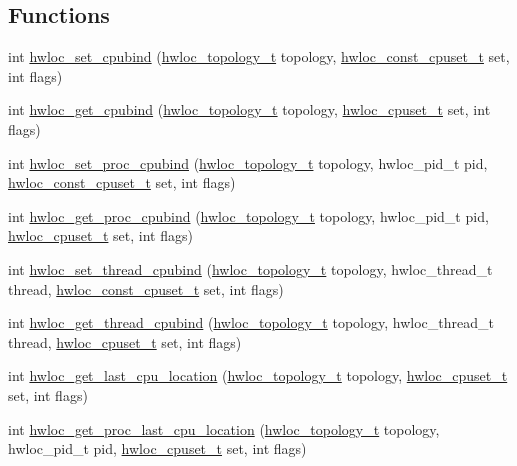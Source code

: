 \subsection*{Functions}
\begin{DoxyCompactItemize}
\item 
int \hyperlink{a00190_ga80bc07473a8edf840cae17bd7ec21d48}{hwloc\+\_\+set\+\_\+cpubind} (\hyperlink{a00186_ga9d1e76ee15a7dee158b786c30b6a6e38}{hwloc\+\_\+topology\+\_\+t} topology, \hyperlink{a00183_ga1f784433e9b606261f62d1134f6a3b25}{hwloc\+\_\+const\+\_\+cpuset\+\_\+t} set, int flags)
\item 
int \hyperlink{a00190_gacba7ecb979baf824d5240fa2cb2a8be6}{hwloc\+\_\+get\+\_\+cpubind} (\hyperlink{a00186_ga9d1e76ee15a7dee158b786c30b6a6e38}{hwloc\+\_\+topology\+\_\+t} topology, \hyperlink{a00183_ga4bbf39b68b6f568fb92739e7c0ea7801}{hwloc\+\_\+cpuset\+\_\+t} set, int flags)
\item 
int \hyperlink{a00190_ga296db8a3c6d49b51fb83d6f3e45c02a6}{hwloc\+\_\+set\+\_\+proc\+\_\+cpubind} (\hyperlink{a00186_ga9d1e76ee15a7dee158b786c30b6a6e38}{hwloc\+\_\+topology\+\_\+t} topology, hwloc\+\_\+pid\+\_\+t pid, \hyperlink{a00183_ga1f784433e9b606261f62d1134f6a3b25}{hwloc\+\_\+const\+\_\+cpuset\+\_\+t} set, int flags)
\item 
int \hyperlink{a00190_gac82de91f788fa82dacf99c6e0d4b7158}{hwloc\+\_\+get\+\_\+proc\+\_\+cpubind} (\hyperlink{a00186_ga9d1e76ee15a7dee158b786c30b6a6e38}{hwloc\+\_\+topology\+\_\+t} topology, hwloc\+\_\+pid\+\_\+t pid, \hyperlink{a00183_ga4bbf39b68b6f568fb92739e7c0ea7801}{hwloc\+\_\+cpuset\+\_\+t} set, int flags)
\item 
int \hyperlink{a00190_gae42c01b2addcfbf6048b9a516dd7a906}{hwloc\+\_\+set\+\_\+thread\+\_\+cpubind} (\hyperlink{a00186_ga9d1e76ee15a7dee158b786c30b6a6e38}{hwloc\+\_\+topology\+\_\+t} topology, hwloc\+\_\+thread\+\_\+t thread, \hyperlink{a00183_ga1f784433e9b606261f62d1134f6a3b25}{hwloc\+\_\+const\+\_\+cpuset\+\_\+t} set, int flags)
\item 
int \hyperlink{a00190_gaf13f765642b5d0d9a9813e6bb043671b}{hwloc\+\_\+get\+\_\+thread\+\_\+cpubind} (\hyperlink{a00186_ga9d1e76ee15a7dee158b786c30b6a6e38}{hwloc\+\_\+topology\+\_\+t} topology, hwloc\+\_\+thread\+\_\+t thread, \hyperlink{a00183_ga4bbf39b68b6f568fb92739e7c0ea7801}{hwloc\+\_\+cpuset\+\_\+t} set, int flags)
\item 
int \hyperlink{a00190_gafdb374627358bf09203b5a4215b13032}{hwloc\+\_\+get\+\_\+last\+\_\+cpu\+\_\+location} (\hyperlink{a00186_ga9d1e76ee15a7dee158b786c30b6a6e38}{hwloc\+\_\+topology\+\_\+t} topology, \hyperlink{a00183_ga4bbf39b68b6f568fb92739e7c0ea7801}{hwloc\+\_\+cpuset\+\_\+t} set, int flags)
\item 
int \hyperlink{a00190_ga910a05c2d47f68a3155bf176b50fa555}{hwloc\+\_\+get\+\_\+proc\+\_\+last\+\_\+cpu\+\_\+location} (\hyperlink{a00186_ga9d1e76ee15a7dee158b786c30b6a6e38}{hwloc\+\_\+topology\+\_\+t} topology, hwloc\+\_\+pid\+\_\+t pid, \hyperlink{a00183_ga4bbf39b68b6f568fb92739e7c0ea7801}{hwloc\+\_\+cpuset\+\_\+t} set, int flags)
\end{DoxyCompactItemize}


